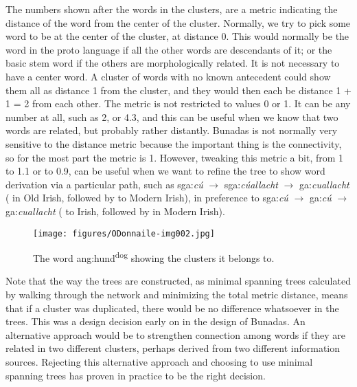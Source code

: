 \documentclass[output=paper,colorlinks,citecolor=brown]{langscibook}
\begin{document}
The numbers shown after the words in the clusters, are a metric indicating the distance of the word from the center of the cluster. Normally, we try to pick some word to be at the center of the cluster, at distance 0. This would normally be the word in the proto language if all the other words are descendants of it; or the basic stem word if the others are morphologically related. It is not necessary to have a center word. A cluster of  words with no known antecedent could show them all as distance 1 from the cluster, and they would then each be distance 1 + 1 = 2 from each other. The metric is not restricted to values 0 or 1. It can be any number at all, such as 2, or 4.3, and this can be useful when we know that two words are related, but probably rather distantly. Bunadas is not normally very sensitive to the distance metric because the important thing is the connectivity, so for the most part the metric is 1. However, tweaking this metric a bit, from 1 to 1.1 or to 0.9, can be useful when we want to refine the tree to show word derivation via a particular path, such as sga:\textit{cú} $\rightarrow$ sga:\textit{cúallacht} $\rightarrow$ ga:\textit{cuallacht} ( in Old Irish, followed by  to Modern Irish), in preference to sga:\textit{cú} $\rightarrow$ ga:\textit{cú} $\rightarrow$ ga:\textit{cuallacht} ( to Irish, followed by  in Modern Irish).

 
\begin{figure}
\texttt{[image: figures/ODonnaile-img002.jpg]}
\caption{The word ang:\textup{hund}\textup{\textsuperscript{dog}} showing the clusters it belongs to.}
\label{fig:odonnaile:2}
\end{figure}

Note that the way the trees are constructed, as minimal spanning trees calculated by walking through the network and minimizing the total metric distance, means that if a cluster was duplicated, there would be no difference whatsoever in the trees. This was a design decision early on in the design of Bunadas. An alternative approach would be to strengthen connection among words if they are related in two different clusters, perhaps derived from two different information sources. Rejecting this alternative approach and choosing to use minimal spanning trees has proven in practice to be the right decision.
\end{document}
